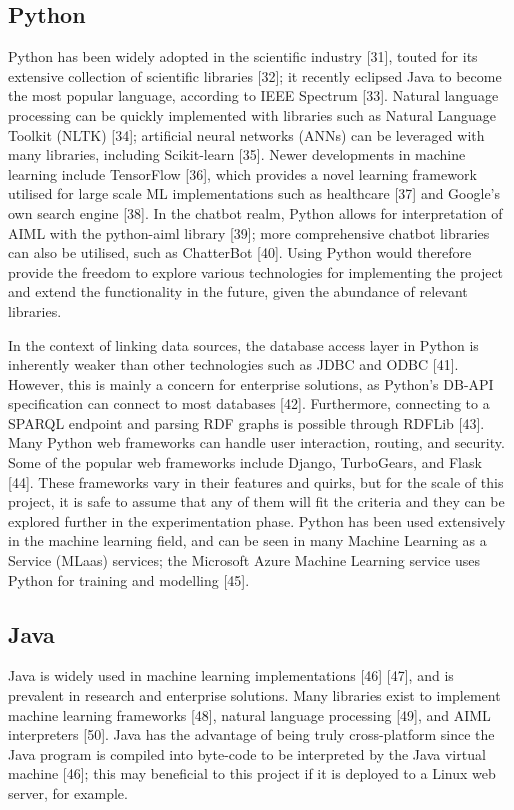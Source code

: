 \subsection{Python}
Python has been widely adopted in the scientific industry [31], touted for its extensive collection of scientific libraries [32]; it recently eclipsed Java to become the most popular language, according to IEEE Spectrum [33]. Natural language processing can be quickly implemented with libraries such as Natural Language Toolkit (NLTK) [34]; artificial neural networks (ANNs) can be leveraged with many libraries, including Scikit-learn [35]. Newer developments in machine learning include TensorFlow [36], which provides a novel learning framework utilised for large scale ML implementations such as healthcare [37] and Google’s own search engine [38]. In the chatbot realm, Python allows for interpretation of AIML with the python-aiml library [39]; more comprehensive chatbot libraries can also be utilised, such as ChatterBot [40]. Using Python would therefore provide the freedom to explore various technologies for implementing the project and extend the functionality in the future, given the abundance of relevant libraries.

In the context of linking data sources, the database access layer in Python is inherently weaker than other technologies such as JDBC and ODBC [41]. However, this is mainly a concern for enterprise solutions, as Python’s DB-API specification can connect to most databases [42]. Furthermore, connecting to a SPARQL endpoint and parsing RDF graphs is possible through RDFLib [43]. Many Python web frameworks can handle user interaction, routing, and security. Some of the popular web frameworks include Django, TurboGears, and Flask [44]. These frameworks vary in their features and quirks, but for the scale of this project, it is safe to assume that any of them will fit the criteria and they can be explored further in the experimentation phase.
Python has been used extensively in the machine learning field, and can be seen in many Machine Learning as a Service (MLaas) services; the Microsoft Azure Machine Learning service uses Python for training and modelling [45]. 

\subsection{Java}
Java is widely used in machine learning implementations [46] [47], and is prevalent in research and enterprise solutions. Many libraries exist to implement machine learning frameworks [48], natural language processing [49], and AIML interpreters [50]. Java has the advantage of being truly cross-platform since the Java program is compiled into byte-code to be interpreted by the Java virtual machine [46]; this may beneficial to this project if it is deployed to a Linux web server, for example.\\

